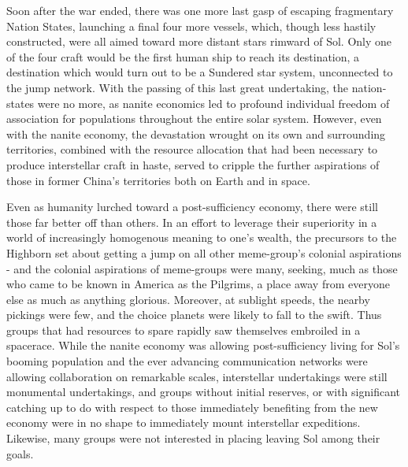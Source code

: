 Soon after the war ended, there was one more last gasp of escaping
fragmentary Nation States, launching a final four more vessels, which,
though less hastily constructed, were all aimed toward more distant
stars rimward of Sol. Only one of the four craft would be the first
human ship to reach its destination, a destination which would turn
out to be a Sundered star system, unconnected to the jump
network. With the passing of this last great undertaking, the
nation-states were no more, as nanite economics led to profound
individual freedom of association for populations throughout the
entire solar system. However, even with the nanite economy, the
devastation wrought on its own and surrounding territories, combined
with the resource allocation that had been necessary to produce
interstellar craft in haste, served to cripple the further aspirations
of those in former China's territories both on Earth and in space.

Even as humanity lurched toward a post-sufficiency economy, there were
still those far better off than others. In an effort to leverage their
superiority in a world of increasingly homogenous meaning to one's
wealth, the precursors to the Highborn set about getting a jump on all
other meme-group's colonial aspirations - and the colonial aspirations
of meme-groups were many, seeking, much as those who came to be known
in America as the Pilgrims, a place away from everyone else as much as
anything glorious. Moreover, at sublight speeds, the nearby pickings
were few, and the choice planets were likely to fall to the
swift. Thus groups that had resources to spare rapidly saw themselves
embroiled in a spacerace. While the nanite economy was allowing
post-sufficiency living for Sol's booming population and the ever
advancing communication networks were allowing collaboration on
remarkable scales, interstellar undertakings were still monumental
undertakings, and groups without initial reserves, or with significant
catching up to do with respect to those immediately benefiting from
the new economy were in no shape to immediately mount interstellar
expeditions. Likewise, many groups were not interested in placing
leaving Sol among their goals.

